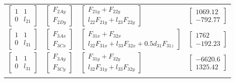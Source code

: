 \begin{table}
\begin{tabular}{llll}
		$ \begin{bmatrix} 1 & 1\\ 0 & l_{21} \end{bmatrix}  $  & 
		$ \begin{bmatrix} F_{2Ay}\\ F_{2Dy} \end{bmatrix} $ & 
		$ \begin{bmatrix} F_{21y}+F_{22y}\\ l_{22}F_{21y}+l_{23}F_{22y} \end{bmatrix} $ &
		$ \begin{bmatrix} 1069.12 \\ -792.77 \end{bmatrix} $\\\addlinespace[1.5ex]
		$ \begin{bmatrix} 1 & 1\\ 0 & l_{31} \end{bmatrix}  $  & 
		$ \begin{bmatrix} F_{3Ax}\\ F_{3Cx} \end{bmatrix} $ & 
		$ \begin{bmatrix} F_{31x}+F_{32x}\\ l_{32}F_{31x}+l_{33}F_{32x}+0.5d_{31}F_{31z} \end{bmatrix} $ &
		$ \begin{bmatrix} 1762 \\ -192.23 \end{bmatrix} $\\\addlinespace[1.5ex]
		$ \begin{bmatrix} 1 & 1\\ 0 & l_{31} \end{bmatrix}  $  & 
		$ \begin{bmatrix} F_{3Ay}\\ F_{3Cy} \end{bmatrix} $ & 
		$ \begin{bmatrix} F_{31y}+F_{32y}\\ l_{32}F_{31y}+l_{33}F_{32y} \end{bmatrix} $ &
		$ \begin{bmatrix} -6620.6\\ 1325.42 \end{bmatrix} $\\\addlinespace[1.5ex]
		\bottomrule
	\end{tabular}
	\label{soltab}
\end{table}

